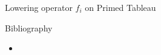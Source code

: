 \documentclass[final]{beamer}
\theoremstyle{definition}
\numberwithin{equation}{section}
\newlength{\onecolwid}
\begin{document}
\begin{frame}[t]
\begin{columns}[t]
\begin{column}{\onecolwid}
\begin{block}{Lowering operator $f_i$ on Primed Tableau}
\begin{itemize}
\end{itemize}

\end{block}


\begin{block}{Bibliography}

\begin{itemize}
\item
\end{itemize}

\end{block}



\end{column} %

\end{columns} %

\end{frame} %
\end{document}
